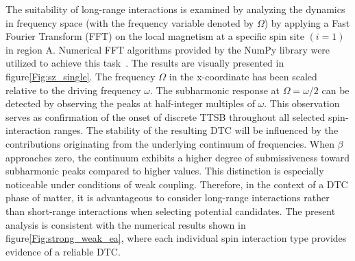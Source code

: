 \documentclass[12pt]{iopart}
\begin{document}
The suitability of long-range interactions is examined by analyzing the dynamics in frequency space (with the frequency variable denoted by $\Omega$) by applying a Fast Fourier Transform (FFT) on the local magnetism at a specific spin site $(i=1)$ in region A. Numerical FFT algorithms provided by the NumPy library were utilized to achieve this task~\cite{harris2020array}. The results are visually presented in figure\ref{Fig:sz_single}.  The frequency $\Omega$ in the x-coordinate has been scaled relative to the driving frequency $\omega$. The subharmonic response at $\Omega=\omega/2$ can be detected by observing the peaks at half-integer multiples of $\omega$. This observation serves as confirmation of the onset of discrete TTSB throughout all selected spin-interaction ranges. The stability of the resulting DTC will be influenced by the contributions originating from the underlying continuum of frequencies. When $\beta$ approaches zero, the continuum exhibits a higher degree of submissiveness toward subharmonic peaks compared to higher values. This distinction is especially noticeable under conditions of weak coupling. Therefore, in the context of a DTC phase of matter, it is advantageous to consider long-range interactions rather than short-range interactions when selecting potential candidates. The present analysis is consistent with the numerical results shown in figure\ref{Fig:strong_weak_ea}, where each individual spin interaction type provides evidence of a reliable DTC.	
\end{document}
